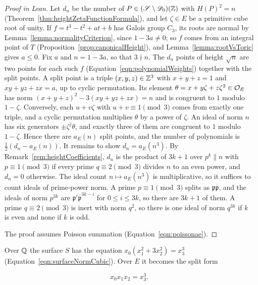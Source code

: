 \begin{proof}[Proof in Lean]

\leanok


Let $d_n$ be the number of $P\in(\mathscr{S}\setminus\mathscr{D}_0)(\mathbb{Z})$ with $H(P)^2=n$ (Theorem~\ref{thm:heightZetaFunctionFormula}), and let $\zeta\in E$ be a primitive cube root of unity. If $f=t^3-t^2+at+b$ has Galois group $C_3$, its roots are normal by Lemma~\ref{lemma:normalityCriterion}, since $1-3a\neq0$; so $f$ comes from an integral point of $T$ (Proposition~\ref{prop:canonicalHeight}), and Lemma~\ref{lemma:rootVsToric} gives $a\leq0$. Fix $a$ and $n=1-3a$, so that $3\nmid n$. The $d_n$ points of height $\sqrt n$ are two points for each such $f$ (Equation~\ref{eqn:polynomialWeights}) together with the split points. A split point is a triple $(x,y,z)\in\mathbb{Z}^3$ with $x+y+z=1$ and $xy+yz+zx=a$, up to cyclic permutation. Its element $\theta=x+y\zeta+z\zeta^2\in\mathcal{O}_E$ has norm $(x+y+z)^2-3(xy+yz+zx)=n$ and is congruent to $1$ modulo $1-\zeta$. Conversely, each $u+v\zeta$ with $u+v\equiv1\pmod3$ comes from exactly one triple, and a cyclic permutation multiplies $\theta$ by a power of $\zeta$. An ideal of norm $n$ has six generators $\pm\zeta^j\theta$, and exactly three of them are congruent to $1$ modulo $1-\zeta$. Hence there are $a_E(n)$ split points, and the number of polynomials is $\frac12(d_n-a_E(n))$. It remains to show $d_n=a_E(n^3)$. By Remark~\ref{rem:heightCoefficients}, $d_n$ is the product of $3k+1$ over $p^k\parallel n$ with $p\equiv1\pmod3$ if every prime $q\equiv2\pmod3$ divides $n$ to an even power, and $d_n=0$ otherwise. The ideal count $n\mapsto a_E(n^3)$ is multiplicative, so it suffices to count ideals of prime-power norm. A prime $p\equiv1\pmod3$ splits as $\mathfrak p\overline{\mathfrak p}$, and the ideals of norm $p^{3k}$ are $\mathfrak p^i\overline{\mathfrak p}^{3k-i}$ for $0\leq i\leq3k$, so there are $3k+1$ of them. A prime $q\equiv2\pmod3$ is inert with norm $q^2$, so there is one ideal of norm $q^{3k}$ if $k$ is even and none if $k$ is odd.

The proof assumes Poisson summation (Equation~\ref{eqn:poissonae}).

\end{proof}

\begin{equationnode}

\label{eqn:splitForm}


\leanok

Over $\mathbb{Q}$ the surface $S$ has the equation $x_0(x_1^2+3x_2^2)=x_3^3$ (Equation~\ref{eqn:surfaceNormCubic}). Over $E$ it becomes the split form

\begin{equation*} x_0x_1x_2=x_3^3. \end{equation*}

\end{equationnode}

